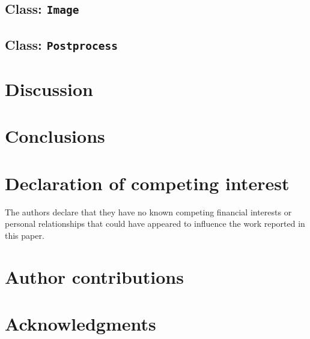 \documentclass[a4paper,fleqn]{cas-dc}
\begin{document}
\subsection{Class: \texttt{Image}} \label{sec:class-particle}



\subsection{Class: \texttt{Postprocess}} \label{sec:class-particle}






\section{Discussion} \label{sec:results}

\lipsum

%


\section{Conclusions}



\section*{Declaration of competing interest}

The authors declare that they have no known competing financial interests or personal relationships that could have appeared to influence the work reported in this paper.

\section*{Author contributions}



\section*{Acknowledgments}






\end{document}

